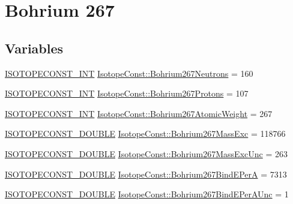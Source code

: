 \hypertarget{group___isotope_const-_bohrium-_bh267}{}\section{Bohrium 267}
\label{group___isotope_const-_bohrium-_bh267}
\subsection*{Variables}
\begin{DoxyCompactItemize}
\item 
\mbox{\hyperlink{group___isotope_const-_macros_ga5f18360b3e99483a35c32d789e62621c}{I\+S\+O\+T\+O\+P\+E\+C\+O\+N\+S\+T\+\_\+\+I\+NT}} \mbox{\hyperlink{group___isotope_const-_bohrium-_bh267_gab46dc352dc0810de4cca79f440bbd74f}{Isotope\+Const\+::\+Bohrium267\+Neutrons}} = 160
\item 
\mbox{\hyperlink{group___isotope_const-_macros_ga5f18360b3e99483a35c32d789e62621c}{I\+S\+O\+T\+O\+P\+E\+C\+O\+N\+S\+T\+\_\+\+I\+NT}} \mbox{\hyperlink{group___isotope_const-_bohrium-_bh267_ga210e29d6675662e7c88686a3dc31a444}{Isotope\+Const\+::\+Bohrium267\+Protons}} = 107
\item 
\mbox{\hyperlink{group___isotope_const-_macros_ga5f18360b3e99483a35c32d789e62621c}{I\+S\+O\+T\+O\+P\+E\+C\+O\+N\+S\+T\+\_\+\+I\+NT}} \mbox{\hyperlink{group___isotope_const-_bohrium-_bh267_ga2bc671cdea2973c1cf6cc78c7b071e50}{Isotope\+Const\+::\+Bohrium267\+Atomic\+Weight}} = 267
\item 
\mbox{\hyperlink{group___isotope_const-_macros_ga8f45a7272ce02c0b4c65c44636ed719a}{I\+S\+O\+T\+O\+P\+E\+C\+O\+N\+S\+T\+\_\+\+D\+O\+U\+B\+LE}} \mbox{\hyperlink{group___isotope_const-_bohrium-_bh267_gaa8088440b4fde806a59d721a8b003f35}{Isotope\+Const\+::\+Bohrium267\+Mass\+Exc}} = 118766
\item 
\mbox{\hyperlink{group___isotope_const-_macros_ga8f45a7272ce02c0b4c65c44636ed719a}{I\+S\+O\+T\+O\+P\+E\+C\+O\+N\+S\+T\+\_\+\+D\+O\+U\+B\+LE}} \mbox{\hyperlink{group___isotope_const-_bohrium-_bh267_gaa831d0ebc9647134d2029794be5c9586}{Isotope\+Const\+::\+Bohrium267\+Mass\+Exc\+Unc}} = 263
\item 
\mbox{\hyperlink{group___isotope_const-_macros_ga8f45a7272ce02c0b4c65c44636ed719a}{I\+S\+O\+T\+O\+P\+E\+C\+O\+N\+S\+T\+\_\+\+D\+O\+U\+B\+LE}} \mbox{\hyperlink{group___isotope_const-_bohrium-_bh267_gac6c837cfae65eb73afaed5cd1425ee74}{Isotope\+Const\+::\+Bohrium267\+Bind\+E\+PerA}} = 7313
\item 
\mbox{\hyperlink{group___isotope_const-_macros_ga8f45a7272ce02c0b4c65c44636ed719a}{I\+S\+O\+T\+O\+P\+E\+C\+O\+N\+S\+T\+\_\+\+D\+O\+U\+B\+LE}} \mbox{\hyperlink{group___isotope_const-_bohrium-_bh267_gab1883700ea87ef28d64988dce6d41d35}{Isotope\+Const\+::\+Bohrium267\+Bind\+E\+Per\+A\+Unc}} = 1

\end{DoxyCompactItemize}
